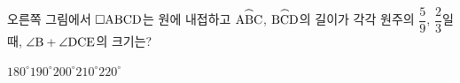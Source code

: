 \noindent\begin{minipage}[t]{0.58\linewidth}\vspace{0pt}\raggedright 오른쪽 그림에서 $\square\mathrm{ABCD}$는 원에 내접하고 $\overset{\frown}{\mathrm{ABC}}$, $\overset{\frown}{\mathrm{BCD}}$의 길이가 각각 원주의 $\dfrac{5}{9}$, $\dfrac{2}{3}$일 때, $\angle\mathrm{B}+\angle\mathrm{DCE}$의 크기는?\end{minipage}\hfill\begin{minipage}[t]{0.4\linewidth}\vspace{0pt}\centering \resizebox{\ifdim\width>\linewidth\linewidth\else\width\fi}{!}{}\end{minipage}\par
\begin{choices32}{$180^\circ$}{$190^\circ$}{$200^\circ$}{$210^\circ$}{$220^\circ$}\end{choices32}
